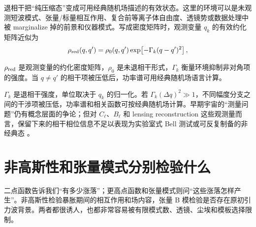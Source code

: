 退相干把“纯压缩态”变成可用经典随机场描述的有效状态。这里的环境可以是未观测短波模式、张量/标量相互作用、复合前等离子体自由度、透镜势或数据处理中被 marginalize 掉的前景和仪器模式。写成密度矩阵时，观测变量 \(q_k\) 的有效约化矩阵近似为
\begin{equation}
  \rho_{\rm red}(q,q')
  =
  \rho_0(q,q')
  \exp\!\left[-\Gamma_k(q-q')^2\right],
  \label{eq:ch16-decoherence-density}
\end{equation}
\begin{formulaexplain}[公式 (16.10) 解读]
\(\rho_{\rm red}\) 是观测变量的约化密度矩阵，\(\rho_0\) 是未退相干形式，\(\Gamma_k\) 衡量环境抑制非对角项的强度。当 \(q\neq q'\) 的相干项被压低后，功率谱可用经典随机场语言计算。
\end{formulaexplain}
\(\Gamma_k\) 是退相干强度，单位取决于 \(q_k\) 的归一化。若 \(\Gamma_k(\Delta q)^2\gg1\)，不同幅度分支之间的干涉项被压低，功率谱和相关函数可按经典随机场计算。早期宇宙的“测量问题”仍有概念层面的争论；但对 \(C_\ell\)、\(B_\ell\) 和 lensing reconstruction 这些观测量而言，保留下来的相干相位信息不足以表现为实验室式 Bell 测试或可反复制备的非经典态 \citep{1996CQGra..13..377P,2006CQGra..23.2317P}。

\section{非高斯性和张量模式分别检验什么}

二点函数告诉我们“有多少涨落”；更高点函数和张量模式则问“这些涨落怎样产生”。非高斯性检验暴胀期间的相互作用和场内容，张量 B 模检验是否存在原初引力波背景。两者都很诱人，也都非常容易被有限模式数、透镜、尘埃和模板选择限制。

